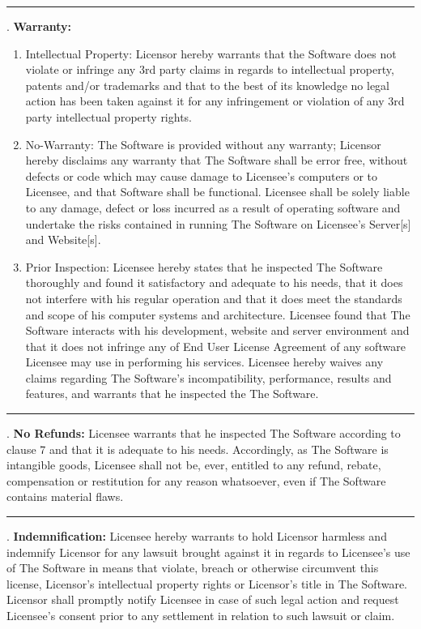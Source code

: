 \documentclass[oneside,openany,11pt,a4paper]{report}
\begin{document}
\noindent\rule{\textwidth}{0.5pt}
. \textbf{Warranty: }
\begin{enumerate}
	\item Intellectual Property: Licensor hereby warrants that the Software does not violate or infringe any 3rd party claims in regards to intellectual property, patents and/or trademarks and that to the best of its knowledge no legal action has been taken against it for any infringement or violation of any 3rd party intellectual property rights.
\item No-Warranty: The Software is provided without any warranty; Licensor hereby disclaims any warranty that The Software shall be error free, without defects or code which may cause damage to Licensee’s computers or to Licensee, and that Software shall be functional. Licensee shall be solely liable to any damage, defect or loss incurred as a result of operating software and undertake the risks contained in running The Software on Licensee’s Server[s] and Website[s].
\item  Prior Inspection: Licensee hereby states that he inspected The Software thoroughly and found it satisfactory and adequate to his needs, that it does not interfere with his regular operation and that it does meet the standards and scope of his computer systems and architecture. Licensee found that The Software interacts with his development, website and server environment and that it does not infringe any of End User License Agreement of any software Licensee may use in performing his services. Licensee hereby waives any claims regarding The Software's incompatibility, performance, results and features, and warrants that he inspected the The Software.
\end{enumerate}

\noindent\rule{\textwidth}{0.5pt}
. \textbf{No Refunds:} Licensee warrants that he inspected The Software according to clause 7 and that it is adequate to his needs. Accordingly, as The Software is intangible goods, Licensee shall not be, ever, entitled to any refund, rebate, compensation or restitution for any reason whatsoever, even if The Software contains material flaws.

\noindent\rule{\textwidth}{0.5pt}
. \textbf{Indemnification:} Licensee hereby warrants to hold Licensor harmless and indemnify Licensor for any lawsuit brought against it in regards to Licensee’s use of The Software in means that violate, breach or otherwise circumvent this license, Licensor's intellectual property rights or Licensor's title in The Software. Licensor shall promptly notify Licensee in case of such legal action and request Licensee’s consent prior to any settlement in relation to such lawsuit or claim.
\end{document}
